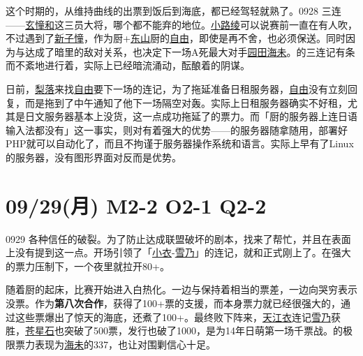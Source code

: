 这个时期的，从维持曲线的出票到饭后到海底，都已经驾轻就熟了。0928 三连——\uline{玄憧和}这三员大将，哪个都不能弃的地位。\uline{小路绫}可以说赛前一直在有人吹，不过遇到了\uline{新子憧}，作为厨+\uline{东山}厨的\uline{自由}，即使是再不舍，也必须保送。同时因为与达成了暗里的敌对关系，也决定下一场A死最大对手\uline{园田海未}。的三连记有条而不紊地进行着，实际上已经暗流涌动，酝酿着的阴谋。

日前，\uline{梨落}来找\uline{自由}要下一场的连记，为了拖延准备日租服务器，\uline{自由}没有立刻回复，而是拖到了中午通知了他下一场隔空对轰。实际上日租服务器确实不好租，尤其是日文服务器基本上没货，这一点成功拖延了的票力。而「厨的服务器上连日语输入法都没有」这一事实，则对有着强大的优势——的服务器随拿随用，部署好PHP就可以自动化了，而且不拘谨于服务器操作系统和语言。实际上早有了Linux的服务器，没有图形界面对反而是优势。

\section{09/29(月) M2-2 O2-1 Q2-2}


0929 各种信任的破裂。为了防止达成联盟破坏的剧本，找来了帮忙，并且在表面上没有提到这一点。开场引领了「\uline{小衣}-\uline{雪乃}」的连记，就和正式刚上了。在强大的票力压制下，一个夜里就拉开80+。

随着厨的起床，比赛开始进入白热化。一边与保持着相当的票差，一边向哭穷表示没票。作为\textbf{第八次合作}，获得了100+票的支援，而本身票力就已经很强大的，通过这些票爆出了惊天的海底，还煮了100+。最终败下阵来，\uline{天江衣}连记\uline{雪乃}获胜，\uline{苍星石}也突破了500票，发行也破了1000，是为14年日萌第一场千票战。的极限票力表现为\uline{海未}的337，也让对围剿信心十足。

